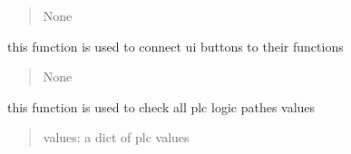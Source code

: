 \documentclass[letterpaper,10pt,english]{sphinxmanual}
\begin{document}
\begin{savenotes}
\begin{fulllineitems}
\begin{savenotes}
\begin{fulllineitems}
\begin{quote}
\begin{description}
\sphinxAtStartPar
None

\end{description}\end{quote}

\end{fulllineitems}\end{savenotes}


\begin{savenotes}\begin{fulllineitems}
\label{\detokenize{setting/setting_api:oxin.setting_api.API.button_connector}}
\pysigstartsignatures
{}
\pysigstopsignatures
\sphinxAtStartPar
this function is used to connect ui buttons to their functions
\begin{quote}\begin{description}
\sphinxAtStartPar
None

\end{description}\end{quote}

\end{fulllineitems}\end{savenotes}


\begin{savenotes}\begin{fulllineitems}
\label{\detokenize{setting/setting_api:oxin.setting_api.API.check_all_plc_parms}}
\pysigstartsignatures
{}
\pysigstopsignatures
\sphinxAtStartPar
this function is used to check all plc logic pathes values
\begin{quote}\begin{description}
\sphinxAtStartPar
values: a dict of plc values

\end{description}\end{quote}

\end{fulllineitems}\end{savenotes}


\end{fulllineitems}
\end{savenotes}
\end{document}
